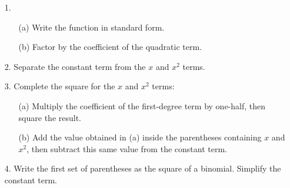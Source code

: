 \documentclass{ximera}
\begin{document}
\begin{summary}
\begin{enumerate}
    \item[1.] \begin{enumerate}
        \item[(a)] Write the function in standard form.

        \item[(b)] Factor by the coefficient of the quadratic term.
    \end{enumerate}
    \item[2.] Separate the constant term from the $x$ and $x^2$ terms.
    \item[3.] Complete the square for the $x$ and $x^2$ terms:
    \begin{enumerate}
        \item[(a)] Multiply the coefficient of the first-degree term by one-half, then square the result.
        \item[(b)] Add the value obtained in (a) inside the parentheses containing $x$ and $x^2$, then subtract this same value from the constant term.
    \end{enumerate}
    \item[4.] Write the first set of parentheses as the square of a binomial. Simplify the constant term.
\end{enumerate}
\end{summary}
   
\end{document}
